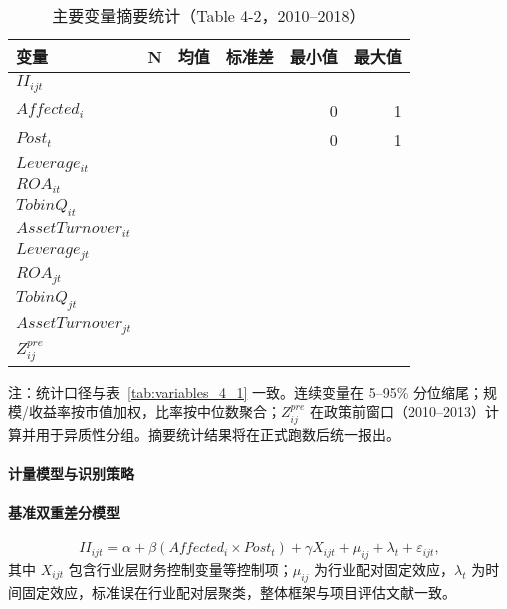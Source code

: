 \begin{table}[htbp]
\centering
\caption{主要变量摘要统计（Table 4-2，2010–2018）}
\label{tab:variables_4_2}
\begin{threeparttable}
\small
\begin{tabular}{lrrrrr}
\toprule
变量 & N & 均值 & 标准差 & 最小值 & 最大值 \\
\midrule
$II_{ijt}$ &  &  &  &  &  \\
$Affected_i$ &  &  &  & 0 & 1 \\
$Post_t$ &  &  &  & 0 & 1 \\
$Leverage_{it}$ &  &  &  &  &  \\
$ROA_{it}$ &  &  &  &  &  \\
$TobinQ_{it}$ &  &  &  &  &  \\
$AssetTurnover_{it}$ &  &  &  &  &  \\
$Leverage_{jt}$ &  &  &  &  &  \\
$ROA_{jt}$ &  &  &  &  &  \\
$TobinQ_{jt}$ &  &  &  &  &  \\
$AssetTurnover_{jt}$ &  &  &  &  &  \\
$Z^{pre}_{ij}$ &  &  &  &  &  \\
\bottomrule
\end{tabular}
\begin{tablenotes}
\footnotesize
\item 注：统计口径与表~\ref{tab:variables_4_1} 一致。连续变量在 5--95\% 分位缩尾；规模/收益率按市值加权，比率按中位数聚合；$Z^{pre}_{ij}$ 在政策前窗口（2010–2013）计算并用于异质性分组。摘要统计结果将在正式跑数后统一报出。
\end{tablenotes}
\end{threeparttable}
\end{table}

\paragraph{计量模型与识别策略}
\label{sec:model_identification}

\paragraph{基准双重差分模型}
\begin{equation}
    II_{ijt} = \alpha + \beta (Affected_i \times Post_t) + \gamma X_{ijt} + \mu_{ij} + \lambda_t + \varepsilon_{ijt},
    \label{eq:baseline_did}
\end{equation}
其中 \(X_{ijt}\) 包含行业层财务控制变量等控制项；\(\mu_{ij}\) 为行业配对固定效应，\(\lambda_t\) 为时间固定效应，标准误在行业配对层聚类，整体框架与项目评估文献一致\citep{imbens2009recent}。

